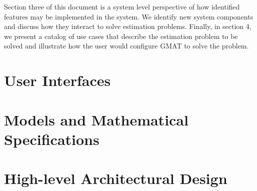 \documentclass[letterpaper,10pt]{book}
\begin{document}
Section three of this document is a system level perspective of how
identified features may be implemented in the system.  We identify
new system components and discuss how they interact to solve
estimation problems.    Finally, in section 4, we present a catalog
of use cases that describe the estimation problem to be solved and
illustrate how the user would configure GMAT to solve the problem.

\chapter{User Interfaces}

    
    
    
    
    
    

\chapter{Models and Mathematical Specifications}
    
    
    
    

\chapter{High-level Architectural Design}
    
    
    
    
    
\end{document}
